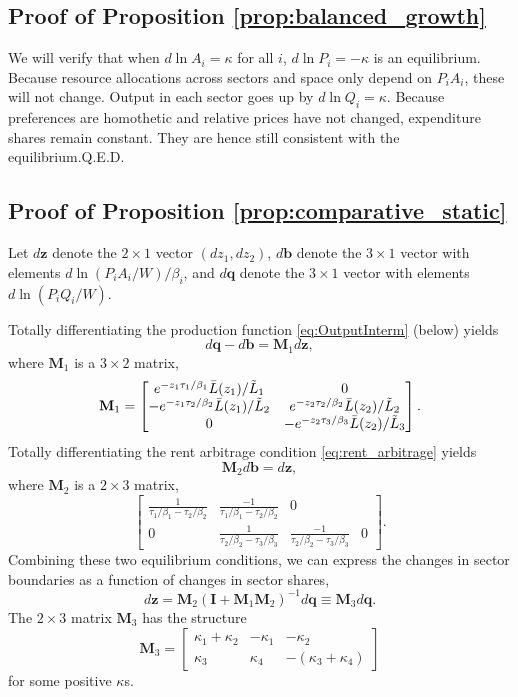 \documentclass[12pt]{article}
\begin{document}
\subsection{Proof of Proposition \ref{prop:balanced_growth}}
We will verify that when $d\ln A_i=\kappa$ for all $i$, $d\ln P_i=-\kappa$ is an equilibrium. Because resource allocations across sectors and space only depend on $P_iA_i$, these will not change. Output in each sector goes up by $d\ln Q_i = \kappa$. Because preferences are homothetic and relative prices have not changed, expenditure shares remain constant. They are hence still consistent with the equilibrium.\hfill Q.E.D.

\subsection{Proof of Proposition \ref{prop:comparative_static}}
Let $d\mathbf z$ denote the $2\times1$ vector $(dz_1,dz_2)$, $d\mathbf b$ denote the $3\times1$ vector with elements $d\ln(P_iA_i/W)/\beta_i$, and $d\mathbf q$ denote the $3\times1$ vector with elements $d\ln(P_iQ_i/W)$.

Totally differentiating the production function \eqref{eq:OutputInterm} (below) yields
\[
d\mathbf q - d\mathbf b = \mathbf M_1 d\mathbf z,
\]
where $\mathbf M_1$ is a $3\times2$ matrix,
\[
\mathbf M_1 =
\begin{bmatrix}
	e^{-z_1\tau_1/\beta_1}\Bar L(z_1)/\tilde L_1 & 0\\
	-e^{-z_1\tau_2/\beta_2}\Bar L(z_1)/\tilde L_2 & 
		e^{-z_2\tau_2/\beta_2}\Bar L(z_2)/\tilde L_2\\
	0 & -e^{-z_2\tau_3/\beta_3}\Bar L(z_2)/\tilde L_3 
\end{bmatrix}.
\]
Totally differentiating the rent arbitrage condition \eqref{eq:rent_arbitrage} yields
\[
\mathbf M_2 d\mathbf b = d\mathbf z, 
\]
where $\mathbf M_2$ is a $2\times3$ matrix,
\[
\begin{bmatrix}
	\frac 1
		{\tau_1/\beta_1 - \tau_2/\beta_2}
	& 	\frac {-1}
		{\tau_1/\beta_1 - \tau_2/\beta_2}
	& 0 \\
	0
	& \frac 1
		{\tau_2/\beta_2 - \tau_3/\beta_3}
	& 	\frac {-1}
		{\tau_2/\beta_2 - \tau_3/\beta_3}
	& 0 
\end{bmatrix}.
\]
Combining these two equilibrium conditions, we can express the changes in sector boundaries as a function of changes in sector shares,
\[
d\mathbf z = \mathbf M_2 (\mathbf I+\mathbf M_1\mathbf M_2)^{-1}d\mathbf q \equiv \mathbf M_3 d\mathbf q.
\]
The $2\times3$ matrix $\mathbf M_3$ has the structure
\[
\mathbf M_3 =
\begin{bmatrix}
\kappa_1+\kappa_2 	& -\kappa_1 	& -\kappa_2 \\
\kappa_3 			& \kappa_4		& -(\kappa_3+\kappa_4)
\end{bmatrix}
\]
for some positive $\kappa$s. 
\end{document}
